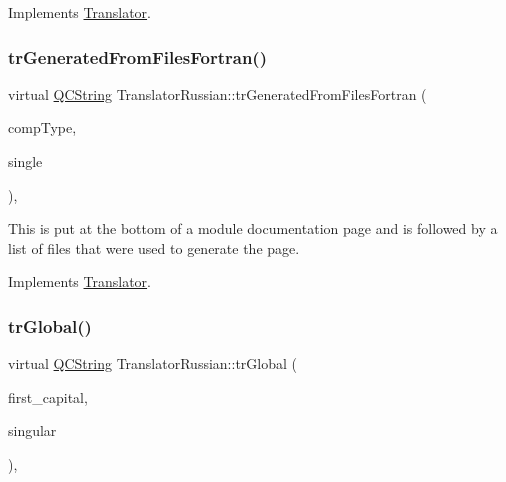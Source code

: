 Implements \mbox{\hyperlink{class_translator}{Translator}}.

\mbox{\label{class_translator_russian_a0b9d60a42b2117ea204b85d1c5ace008}} 
\subsubsection{\texorpdfstring{trGeneratedFromFilesFortran()}{trGeneratedFromFilesFortran()}}
{\footnotesize\ttfamily virtual \mbox{\hyperlink{class_q_c_string}{Q\+C\+String}} Translator\+Russian\+::tr\+Generated\+From\+Files\+Fortran (\begin{DoxyParamCaption}\item[{\mbox{\hyperlink{class_class_def_ae70cf86d35fe954a94c566fbcfc87939}{Class\+Def\+::\+Compound\+Type}}}]{comp\+Type,  }\item[{bool}]{single }\end{DoxyParamCaption})\hspace{0.3cm}{\ttfamily [inline]}, {\ttfamily [virtual]}}

This is put at the bottom of a module documentation page and is followed by a list of files that were used to generate the page. 

Implements \mbox{\hyperlink{class_translator}{Translator}}.

\mbox{\label{class_translator_russian_aa57ec99738a8721fc6ad9ec00b3efed7}} 
\subsubsection{\texorpdfstring{trGlobal()}{trGlobal()}}
{\footnotesize\ttfamily virtual \mbox{\hyperlink{class_q_c_string}{Q\+C\+String}} Translator\+Russian\+::tr\+Global (\begin{DoxyParamCaption}\item[{bool}]{first\+\_\+capital,  }\item[{bool}]{singular }\end{DoxyParamCaption})\hspace{0.3cm}{\ttfamily [inline]}, {\ttfamily [virtual]}}

